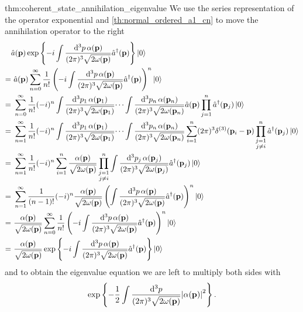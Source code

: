 \begin{delayedproof}{thm:coherent_state_annihilation_eigenvalue}
	We use the series representation of the operator exponential and \cref{th:normal_ordered_a1_cn} to move the annihilation operator to the right
	\begin{equation*}
		\begin{split}
			&
			\hat{a}(\vb{p})
			\exp\left\{
				-i
				\int\frac{\dd[3]{p}\alpha(\vb{p})}{(2\pi)^3\sqrt{2\omega(\vb{p})}}
				\hat{a}^\dagger(\vb{p})
			\right\}
			\ket{0}
			\\
			=&\
			\hat{a}(\vb{p})
			\sum_{n=0}^\infty
			\frac{1}{n!}
			\left(
				-i
				\int\frac{\dd[3]{p}\alpha(\vb{p})}{(2\pi)^3\sqrt{2\omega(\vb{p})}}
				\hat{a}^\dagger(\vb{p})
			\right)^n
			\ket{0}
			\\
			=&\
			\sum_{n=0}^\infty
			\frac{1}{n!}
			(-i)^n
			\int\frac{\dd[3]{p_1}\alpha(\vb{p}_1)}{(2\pi)^3\sqrt{2\omega(\vb{p}_1)}}
			\dots
			\int\frac{\dd[3]{p_n}\alpha(\vb{p}_n)}{(2\pi)^3\sqrt{2\omega(\vb{p}_n)}}
			\hat{a}(\vb{p})
			\prod_{j=1}^n
			\hat{a}^\dagger(\vb{p}_j)
			\ket{0}
			\\
			=&\
			\sum_{n=1}^\infty
			\frac{1}{n!}
			(-i)^n
			\int\frac{\dd[3]{p_1}\alpha(\vb{p}_1)}{(2\pi)^3\sqrt{2\omega(\vb{p}_1)}}
			\dots
			\int\frac{\dd[3]{p_n}\alpha(\vb{p}_n)}{(2\pi)^3\sqrt{2\omega(\vb{p}_n)}}
			\sum_{i=1}^n
			(2\pi)^3
			\delta^{(3)}(\vb{p}_i-\vb{p})
			\prod_{\substack{j=1\\j\neq i}}^n
			\hat{a}^\dagger(\vb{p}_j)
			\ket{0}
			\\
			=&\
			\sum_{n=1}^\infty
			\frac{1}{n!}
			(-i)^n
			\sum_{i=1}^n
			\frac{\alpha(\vb{p})}{\sqrt{2\omega(\vb{p})}}
			\prod_{\substack{j=1\\j\neq i}}^n
			\int\frac{\dd[3]{p_j}\alpha(\vb{p}_j)}{(2\pi)^3\sqrt{2\omega(\vb{p}_j)}}
			\hat{a}^\dagger(\vb{p}_j)
			\ket{0}
			\\
			=&\
			\sum_{n=1}^\infty
			\frac{1}{(n-1)!}
			(-i)^n
			\frac{\alpha(\vb{p})}{\sqrt{2\omega(\vb{p})}}
			\left(
				\int\frac{\dd[3]{p}\alpha(\vb{p})}{(2\pi)^3\sqrt{2\omega(\vb{p})}}
				\hat{a}^\dagger(\vb{p})
			\right)^n
			\ket{0}
			\\
			=&\
			\frac{\alpha(\vb{p})}{\sqrt{2\omega(\vb{p})}}
			\sum_{n=0}^\infty
			\frac{1}{n!}
			\left(
				-i
				\int\frac{\dd[3]{p}\alpha(\vb{p})}{(2\pi)^3\sqrt{2\omega(\vb{p})}}
				\hat{a}^\dagger(\vb{p})
			\right)^n
			\ket{0}
			\\
			=&\
			\frac{\alpha(\vb{p})}{\sqrt{2\omega(\vb{p})}}
			\exp\left\{
				-i
				\int\frac{\dd[3]{p}\alpha(\vb{p})}{(2\pi)^3\sqrt{2\omega(\vb{p})}}
				\hat{a}^\dagger(\vb{p})
			\right\}
			\ket{0}
		\end{split}
	\end{equation*}
	and to obtain the eigenvalue equation we are left to multiply both sides with
	\begin{equation*}
		\exp\left\{
			-
			\frac{1}{2}
			\int\frac{\dd[3]{p}}{(2\pi)^3\sqrt{2\omega(\vb{p})}}
			\abs{\alpha(\vb{p})}^2
		\right\}
		.
	\end{equation*}
\end{delayedproof}

